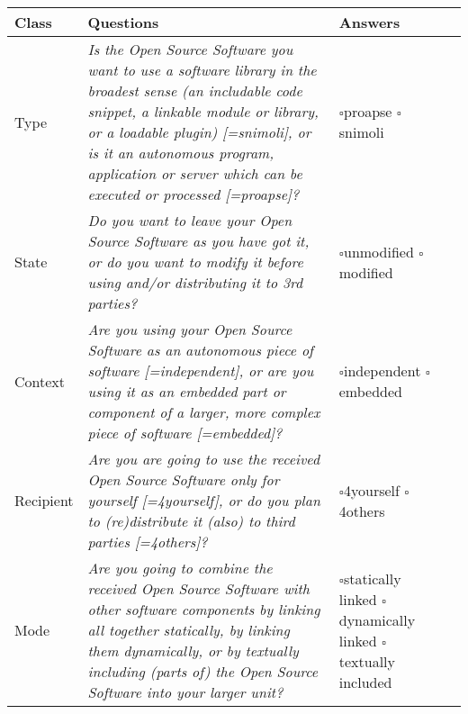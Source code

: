 \begin{small}
\begin{tabular}[h]{|l|l|l|l|}
\hline 
Class & Questions & Answers\\
\hline 
  Type
  & \parbox[c][2.6cm][c]{9.4cm}{
    \textit{Is the Open Source Software you want to use a software library
    in the broadest sense (an includable code snippet, a linkable module or
    library, or a loadable plugin) [=snimoli], or is it an autonomous
    program, application or server which can be executed or processed
    [=proapse]?}} & \parbox{10em}{ 
      $\square$\hspace{1em}proapse\\ 
      $\square$\hspace{1em}snimoli}
    \\
\hline 
  State & 
  \parbox[c][1.6cm][c]{9.4cm}{
  \textit{Do you want to leave your Open Source Software as you have
  got it, or do you want to modify it before using and/or distributing it to 3rd
  parties?}} &
  \parbox{10em}{
    $\square$\hspace{1em}unmodified\\
    $\square$\hspace{1em}modified} \\
\hline 
  Context & 
  \parbox[c][2cm][c]{9.4cm}{
  \textit{Are you using your Open Source Software as an au\-to\-no\-mous piece
  of software [=independent], or are you using it as an embedded part or component
  of a larger, more complex piece of software [=embedded]?}} &
  \parbox{10em}{ $\square$\hspace{1em}independent\\
    $\square$\hspace{1em}embedded}\\
\hline 
  Recipient & 
  \parbox[c][1.6cm][c]{9.4cm}{
  \textit{Are you are going to use the received Open Source Software only for
  yourself [=4yourself], or do you plan to (re)distribute it (also) to third
  parties [=4others]?}}
  & \parbox{10em}{
    $\square$\hspace{1em}4yourself\\
    $\square$\hspace{1em}4others}\\
\hline 
  Mode & 
  \parbox[c][2.6cm][c]{9.4cm}{
  \textit{Are you going to combine the received Open Source Software with other
  software components by linking all together statically, by linking them
  dynamically, or by textually including (parts of) the Open Source Software
  into your larger unit?}} &
  \parbox{10em}{
    $\square$\hspace{1em}statically linked\\   
    $\square$\hspace{1em}dynamically linked\\
    $\square$\hspace{1em}textually included}\\
\hline 
\hline
\end{tabular}
\end{small}

